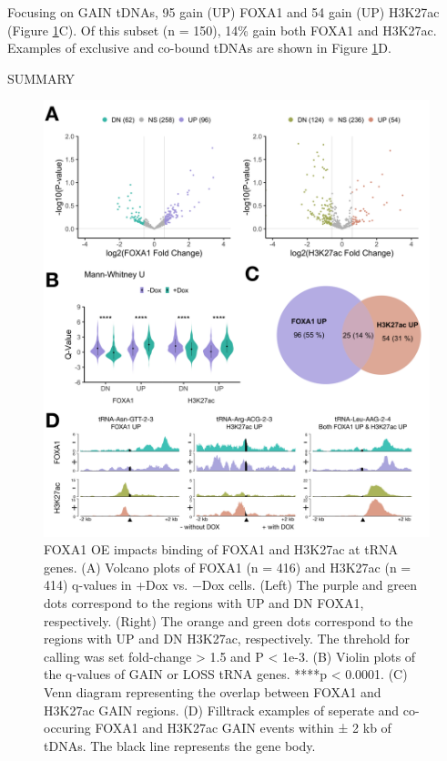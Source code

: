 \documentclass[
  12pt,
]{article}
\begin{document}
Focusing on GAIN tDNAs, 95 gain (UP) FOXA1 and 54 gain (UP) H3K27ac (Figure \ref{fig:results-2}C).
Of this subset (n = 150), 14\% gain both FOXA1 and H3K27ac.
Examples of exclusive and co-bound tDNAs are shown in Figure \ref{fig:results-2}D.

SUMMARY

\begin{figure}[H]
\includegraphics[width=1\linewidth]{../images/results-02} \caption{FOXA1 OE impacts binding of FOXA1 and H3K27ac at tRNA genes. (A) Volcano plots of FOXA1 (n = 416) and H3K27ac (n = 414) q-values in +Dox vs. −Dox cells. (Left) The purple and green dots correspond to the regions with UP and DN FOXA1, respectively. (Right) The orange and green dots correspond to the regions with UP and DN H3K27ac, respectively. The threhold for calling was set fold-change > 1.5 and P < 1e-3. (B) Violin plots of the q-values of GAIN or LOSS tRNA genes. ****p < 0.0001. (C) Venn diagram representing the overlap between FOXA1 and H3K27ac GAIN regions. (D) Filltrack examples of seperate and co-occuring FOXA1 and H3K27ac GAIN events within ± 2 kb of tDNAs. The black line represents the gene body.}\label{fig:results-2}
\end{figure}
\end{document}
